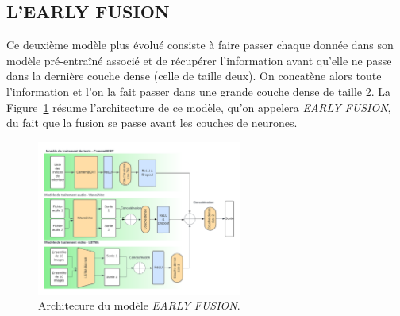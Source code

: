 \subsection{L'EARLY FUSION}
Ce deuxième modèle plus évolué consiste à faire passer chaque donnée dans son modèle pré-entraîné associé et de récupérer
l'information avant qu'elle ne passe dans la dernière couche dense (celle de taille deux). On concatène alors toute l'information 
et l'on la fait passer dans une grande couche dense de taille 2.
La Figure~\ref{fig: EARLY FUSION} résume l'architecture de ce modèle, qu'on appelera \textit{EARLY FUSION}, du fait que la fusion
se passe avant les couches de neurones.

\begin{figure}[H]
    \centering
    \includegraphics[width=0.6\textwidth]{image_model/early_fusion.png}
    \caption{Architecure du modèle \textit{EARLY FUSION}.}
    \label{fig: EARLY FUSION}
\end{figure}
